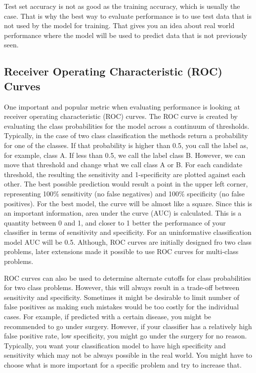 \documentclass[12pt,]{krantz}
\begin{document}
Test set accuracy is not as good as the training accuracy, which is usually the case. That is why the best way to evaluate performance is to use test data that is not used by the model for training. That gives you an idea about real world performance where the model will be used to predict data that is not previously seen.

\hypertarget{receiver-operating-characteristic-roc-curves}{%
\subsection{Receiver Operating Characteristic (ROC) Curves}\label{receiver-operating-characteristic-roc-curves}}

One important and popular metric when evaluating performance is looking at receiver operating characteristic (ROC) curves. The ROC curve is created by evaluating the class probabilities for the model across a continuum of thresholds. Typically, in the case of two class classification the methods return a probability for one of the classes. If that probability is higher than 0.5, you call the label as, for example, class A. If less than 0.5, we call the label class B. However, we can move that threshold and change what we call class A or B. For each candidate threshold, the resulting the sensitivity and 1-specificity are plotted against each other. The best possible prediction would result a point in the upper left corner, representing 100\% sensitivity (no false negatives) and 100\% specificity (no false positives). For the best model, the curve will be almost like a square. Since this is an important information, area under the curve (AUC) is calculated. This is a quantity between 0 and 1, and closer to 1 better the performance of your classifier in terms of sensitivity and specificity. For an uninformative classification model AUC will be 0.5. Although, ROC curves are initially designed fro two class problems, later extensions made it possible to use ROC curves for multi-class problems.

ROC curves can also be used to determine alternate cutoffs for class probabilities for two class problems. However, this will always result in a trade-off between sensitivity and specificity. Sometimes it might be desirable to limit number of false positives as making such mistakes would be too costly for the individual cases. For example, if predicted with a certain disease, you might be recommended to go under surgery. However, if your classifier has a relatively high false positive rate, low specificity, you might go under the surgery for no reason. Typically, you want your classification model to have high specificity and sensitivity which may not be always possible in the real world. You might have to choose what is more important for a specific problem and try to increase that.
\end{document}
